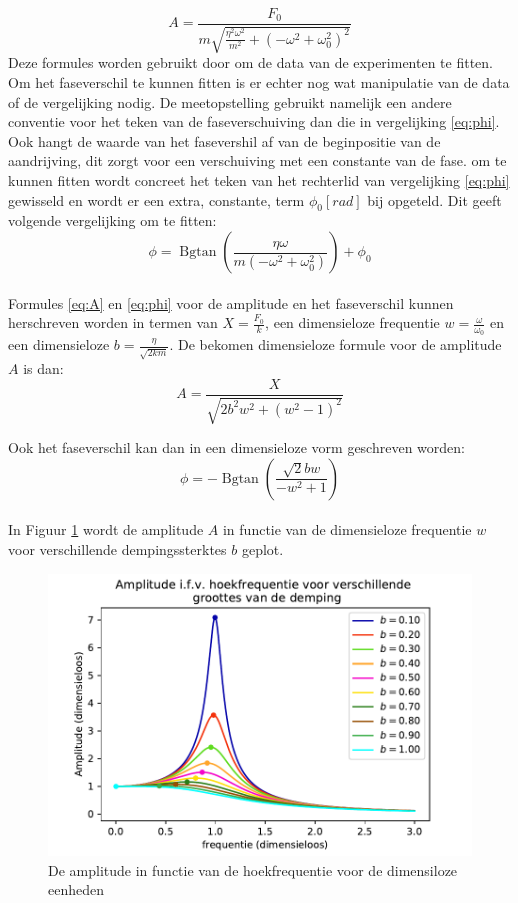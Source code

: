 \documentclass[a4paper]{article}
\begin{document}
\begin{equation}
    A = \frac{F_{0}}{m \sqrt{\frac{\eta^{2} \omega^{2}}{m^{2}} + \left(- \omega^{2} + \omega_{0}^{2}\right)^{2}}}
    \label{eq:A}
\end{equation}
Deze formules worden gebruikt door om de data van de experimenten te fitten. Om het faseverschil te kunnen fitten is er echter nog wat manipulatie van de data of de vergelijking nodig. De meetopstelling gebruikt namelijk een andere conventie voor het teken van de faseverschuiving dan die in vergelijking \ref{eq:phi}. Ook hangt de waarde van het fasevershil af van de beginpositie van de aandrijving, dit zorgt voor een verschuiving met een constante van de fase. om te kunnen fitten wordt concreet het teken van het rechterlid van vergelijking \ref{eq:phi} gewisseld en wordt er een extra, constante, term $\phi_0 [rad]$ bij opgeteld. Dit geeft volgende vergelijking om te fitten:
\begin{equation}
    \phi = \operatorname{Bgtan}{\left (\frac{\eta \omega}{m \left(- \omega^{2} + \omega_{0}^{2}\right)} \right )} + \phi_0
    \label{eq:fit_phi}
\end{equation}
\\
Formules \ref{eq:A} en \ref{eq:phi} voor de amplitude en het faseverschil kunnen herschreven worden in termen van $X = \frac{F_0}{k}$, een dimensieloze frequentie $w = \frac{\omega}{\omega_0}$ en een dimensieloze $b = \frac{\eta}{\sqrt{2km}}$.
De bekomen dimensieloze formule voor de amplitude $A$ is dan:
\begin{equation}
    A = \frac{X}{\sqrt{2 b^{2} w^{2} + \left(w^{2} - 1\right)^{2}}}
    \label{eq:A_dim}
\end{equation}

Ook het faseverschil kan dan in een dimensieloze vorm geschreven worden:
\begin{equation}
    \phi = - \operatorname{Bgtan}{\left (\frac{\sqrt{2} b w}{- w^{2} + 1} \right )}
    \label{eq:phi_dim}
\end{equation}
\\
In Figuur \ref{fig:A_dim} wordt de amplitude $A$ in functie van de dimensieloze frequentie $w$ voor verschillende dempingssterktes $b$ geplot.

\begin{figure}[h]
    \centering
    \includegraphics[width=0.8\linewidth]{dimensieloze_amplitude.pdf}
    \caption{De amplitude in functie van de hoekfrequentie voor de dimensiloze eenheden}
    \label{fig:A_dim}
\end{figure}
\end{document}
